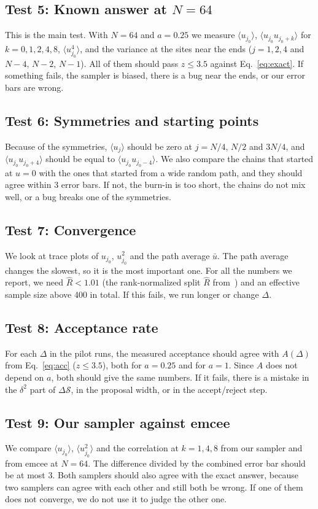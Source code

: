 \documentclass[11pt]{article}
\begin{document}
\subsection*{Test 5: Known answer at $N = 64$}
This is the main test. With $N = 64$ and $a = 0.25$ we measure $\langle u_{j_0}\rangle$, $\langle u_{j_0}u_{j_0+k}\rangle$ for $k = 0, 1, 2, 4, 8$, $\langle u_{j_0}^4\rangle$, and the variance at the sites near the ends ($j = 1, 2, 4$ and $N-4$, $N-2$, $N-1$). All of them should pass $z \le 3.5$ against Eq.~\eqref{eq:exact}. If something fails, the sampler is biased, there is a bug near the ends, or our error bars are wrong.

\subsection*{Test 6: Symmetries and starting points}
Because of the symmetries, $\langle u_j\rangle$ should be zero at $j = N/4$, $N/2$ and $3N/4$, and $\langle u_{j_0}u_{j_0+4}\rangle$ should be equal to $\langle u_{j_0}u_{j_0-4}\rangle$. We also compare the chains that started at $u = 0$ with the ones that started from a wide random path, and they should agree within 3 error bars. If not, the burn-in is too short, the chains do not mix well, or a bug breaks one of the symmetries.

\subsection*{Test 7: Convergence}
We look at trace plots of $u_{j_0}$, $u_{j_0}^2$ and the path average $\bar u$. The path average changes the slowest, so it is the most important one. For all the numbers we report, we need $\hat R < 1.01$ (the rank-normalized split $\hat R$ from~\cite{vehtari}) and an effective sample size above 400 in total. If this fails, we run longer or change $\Delta$.

\subsection*{Test 8: Acceptance rate}
For each $\Delta$ in the pilot runs, the measured acceptance should agree with $A(\Delta)$ from Eq.~\eqref{eq:acc} ($z \le 3.5$), both for $a = 0.25$ and for $a = 1$. Since $A$ does not depend on $a$, both should give the same numbers. If it fails, there is a mistake in the $\delta^2$ part of $\Delta\mathcal S$, in the proposal width, or in the accept/reject step.

\subsection*{Test 9: Our sampler against emcee}
We compare $\langle u_{j_0}\rangle$, $\langle u_{j_0}^2\rangle$ and the correlation at $k = 1, 4, 8$ from our sampler and from emcee at $N = 64$. The difference divided by the combined error bar should be at most 3. Both samplers should also agree with the exact answer, because two samplers can agree with each other and still both be wrong. If one of them does not converge, we do not use it to judge the other one.
\end{document}
